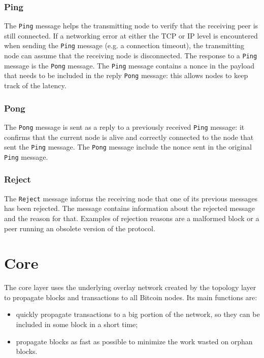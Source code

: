 \subsubsection{Ping}
The \texttt{Ping} message helps the transmitting node to verify that the receiving peer is still connected.
If a networking error at either the TCP or IP level is encountered when sending the \texttt{Ping} message (e.g. a connection timeout), the transmitting node can assume that the receiving node is disconnected.
The response to a \texttt{Ping} message is the \texttt{Pong} message.
The \texttt{Ping} message contains a nonce in the payload that needs to be included in the reply \texttt{Pong} message:
this allows nodes to keep track of the latency.

\subsubsection{Pong}
The \texttt{Pong} message is sent as a reply to a previously received \texttt{Ping} message:
it confirms that the current node is alive and correctly connected to the node that sent the \texttt{Ping} message.
The \texttt{Pong} message include the nonce sent in the original \texttt{Ping} message.

\subsubsection{Reject}
The \texttt{Reject} message informs the receiving node that one of its previous messages has been rejected.
The message contains information about the rejected message and the reason for that.
Examples of rejection reasons are a malformed block or a peer running an obsolete version of the protocol.


\section{Core}
\label{sec:core}
The core layer uses the underlying overlay network created by the topology layer to propagate blocks and transactions to all Bitcoin nodes.
Its main functions are:
\begin{itemize}
	\item quickly propagate transactions to a big portion of the network, so they can be included in some block in a short time;
	\item propagate blocks as fast as possible to minimize the work wasted on orphan blocks.
\end{itemize}

